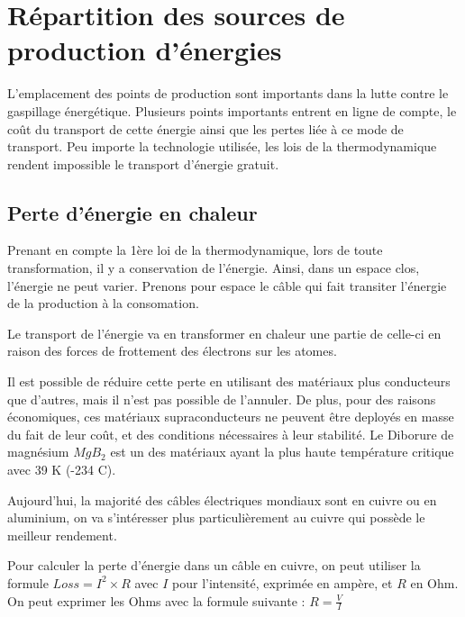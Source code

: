\chapter{Répartition des sources de production d'énergies}

L'emplacement des points de production sont importants dans la lutte contre le gaspillage énergétique.
Plusieurs points importants entrent en ligne de compte, le coût du transport de cette énergie ainsi que les pertes liée à ce mode de transport.
Peu importe la technologie utilisée, les lois de la thermodynamique rendent impossible le transport d'énergie gratuit.

\section{Perte d'énergie en chaleur}

Prenant en compte la 1ère loi de la thermodynamique, lors de toute transformation, il y a conservation de l'énergie.
Ainsi, dans un espace clos, l'énergie ne peut varier.
Prenons pour espace le câble qui fait transiter l'énergie de la production à la consomation.

Le transport de l'énergie va en transformer en chaleur une partie de celle-ci en raison des forces de frottement des électrons sur les atomes.

Il est possible de réduire cette perte en utilisant des matériaux plus conducteurs que d'autres, mais il n'est pas possible de l'annuler.
De plus, pour des raisons économiques, ces matériaux supraconducteurs ne peuvent être deployés en masse du fait de leur coût, et des conditions nécessaires à leur stabilité.
Le Diborure de magnésium $MgB_2$ est un des matériaux ayant la plus haute température critique avec 39 K (-234 C).

Aujourd'hui, la majorité des câbles électriques mondiaux sont en cuivre ou en aluminium, on va s'intéresser plus particulièrement au cuivre qui possède le meilleur rendement.

Pour calculer la perte d'énergie dans un câble en cuivre, on peut utiliser la formule $Loss = I^2\times R$ avec $I$ pour l'intensité, exprimée en ampère, et $R$ en Ohm.
On peut exprimer les Ohms avec la formule suivante : $R = \frac{V}{I}$

